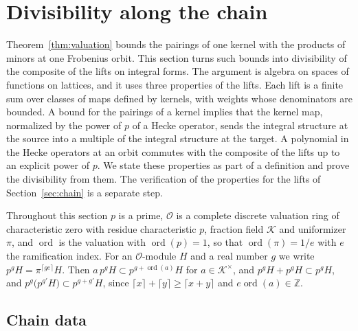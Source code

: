 \section{Divisibility along the chain}\label{sec:chaindiv}

Theorem~\ref{thm:valuation} bounds the pairings of one kernel with the products of minors at one Frobenius orbit. This section turns such bounds into divisibility of the composite of the lifts on integral forms. The argument is algebra on spaces of functions on lattices, and it uses three properties of the lifts. Each lift is a finite sum over classes of maps defined by kernels, with weights whose denominators are bounded. A bound for the pairings of a kernel implies that the kernel map, normalized by the power of $p$ of a Hecke operator, sends the integral structure at the source into a multiple of the integral structure at the target. A polynomial in the Hecke operators at an orbit commutes with the composite of the lifts up to an explicit power of $p$. We state these properties as part of a definition and prove the divisibility from them. The verification of the properties for the lifts of Section~\ref{sec:chain} is a separate step.

Throughout this section $p$ is a prime, $\mathcal O$ is a complete discrete valuation ring of characteristic zero with residue characteristic $p$, fraction field $\mathcal K$ and uniformizer $\pi$, and $\operatorname{ord}$ is the valuation with $\operatorname{ord}(p)=1$, so that $\operatorname{ord}(\pi)=1/e$ with $e$ the ramification index. For an $\mathcal O$-module $H$ and a real number $g$ we write $p^gH=\pi^{\lceil ge\rceil}H$. Then $a\,p^gH\subset p^{g+\operatorname{ord}(a)}H$ for $a\in\mathcal K^\times$, and $p^gH+p^gH\subset p^gH$, and $p^g\big(p^{g'}H\big)\subset p^{g+g'}H$, since $\lceil x\rceil+\lceil y\rceil\ge\lceil x+y\rceil$ and $e\operatorname{ord}(a)\in\mathbb Z$.

\subsection{Chain data}\label{sec:chaindata}

